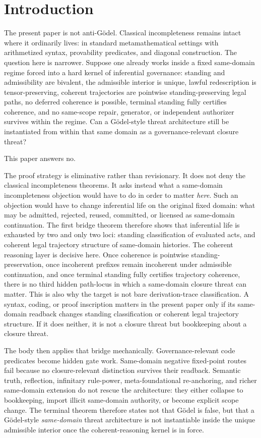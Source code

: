 \section{Introduction}

The present paper is not anti-G\"odel. Classical incompleteness remains intact where it ordinarily lives: in standard metamathematical settings with arithmetized syntax, provability predicates, and diagonal construction. The question here is narrower. Suppose one already works inside a fixed same-domain regime forced into a hard kernel of inferential governance: standing and admissibility are bivalent, the admissible interior is unique, lawful redescription is tensor-preserving, coherent trajectories are pointwise standing-preserving legal paths, no deferred coherence is possible, terminal standing fully certifies coherence, and no same-scope repair, generator, or independent authorizer survives within the regime. Can a G\"odel-style threat architecture still be instantiated from within that same domain as a governance-relevant closure threat?

This paper answers no.

The proof strategy is eliminative rather than revisionary. It does not deny the classical incompleteness theorems. It asks instead what a same-domain incompleteness objection would have to do in order to matter \emph{here}. Such an objection would have to change inferential life on the original fixed domain: what may be admitted, rejected, reused, committed, or licensed as same-domain continuation. The first bridge theorem therefore shows that inferential life is exhausted by two and only two loci: standing classification of evaluated acts, and coherent legal trajectory structure of same-domain histories. The coherent reasoning layer is decisive here. Once coherence is pointwise standing-preservation, once incoherent prefixes remain incoherent under admissible continuation, and once terminal standing fully certifies trajectory coherence, there is no third hidden path-locus in which a same-domain closure threat can matter. This is also why the target is not bare derivation-trace classification. A syntax, coding, or proof inscription matters in the present paper only if its same-domain readback changes standing classification or coherent legal trajectory structure. If it does neither, it is not a closure threat but bookkeeping about a closure threat.

The body then applies that bridge mechanically. Governance-relevant code predicates become hidden gate work. Same-domain negative fixed-point routes fail because no closure-relevant distinction survives their readback. Semantic truth, reflection, infinitary rule-power, meta-foundational re-anchoring, and richer same-domain extension do not rescue the architecture: they either collapse to bookkeeping, import illicit same-domain authority, or become explicit scope change. The terminal theorem therefore states not that G\"odel is false, but that a G\"odel-style \emph{same-domain} threat architecture is not instantiable inside the unique admissible interior once the coherent-reasoning kernel is in force.


